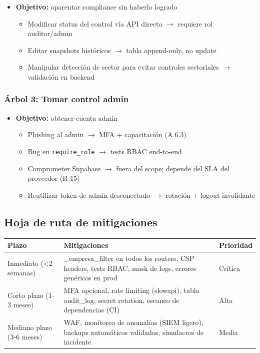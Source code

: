 \documentclass[12pt,a4paper,oneside]{article}
\begin{document}
\begin{itemize}[leftmargin=*]
  \item \textbf{Objetivo:} aparentar compliance sin haberlo logrado
  \begin{itemize}
    \item Modificar status del control vía API directa $\rightarrow$ requiere rol auditor/admin
    \item Editar snapshots históricos $\rightarrow$ tabla append-only, no update
    \item Manipular detección de sector para evitar controles sectoriales $\rightarrow$ validación en backend
  \end{itemize}
\end{itemize}

\subsubsection{Árbol 3: Tomar control admin}

\begin{itemize}[leftmargin=*]
  \item \textbf{Objetivo:} obtener cuenta admin
  \begin{itemize}
    \item Phishing al admin $\rightarrow$ MFA + capacitación (A.6.3)
    \item Bug en \texttt{require\_role} $\rightarrow$ tests RBAC end-to-end
    \item Comprometer Supabase $\rightarrow$ fuera del scope; depende del SLA del proveedor (R-15)
    \item Reutilizar token de admin desconectado $\rightarrow$ rotación + logout invalidante
  \end{itemize}
\end{itemize}

\subsection{Hoja de ruta de mitigaciones}

\begin{table}[h]
\centering
\small
\begin{tabularx}{\textwidth}{lXl}
\toprule
\textbf{Plazo} & \textbf{Mitigaciones} & \textbf{Prioridad} \\
\midrule
Inmediato (<2 semanas) & \_empresa\_filter en todos los routers, CSP headers, tests RBAC, mask de logs, errores genéricos en prod & Crítica \\
Corto plazo (1-3 meses) & MFA opcional, rate limiting (slowapi), tabla audit\_log, secret rotation, escaneo de dependencias (CI) & Alta \\
Mediano plazo (3-6 meses) & WAF, monitoreo de anomalías (SIEM ligero), backups automáticos validados, simulacros de incidente & Media \\
\bottomrule
\end{tabularx}
\end{table}
\end{document}
